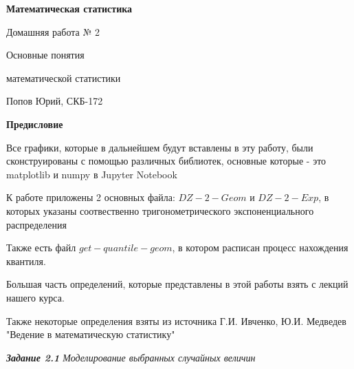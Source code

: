 \documentclass[a4paper,12pt, oneside]{book}
\begin{document}
	\pagestyle{plain}
	
	\begin{titlepage}	
		\begin{center}
			{\Huge \textbf{Математическая статистика}}
			\vspace{30mm}
			
			{\Huge Домашняя работа № 2 \\}
			\vspace{30mm}
			
			{\huge Основные понятия 
				
				математической статистики}
			\vspace{30mm}
			
			{\Large Попов Юрий, СКБ-172}
		\end{center}
	\end{titlepage}
	
	
	
	\begin{spacing}{0.99}          
		\tableofcontents %
	\end{spacing}

\newpage
\begin{center}
	{\Huge{\bf{Предисловие}}}
\end{center}

\vspace{5mm}
Все графики, которые в дальнейшем будут вставлены в эту работу, были сконструированы с помощью различных библиотек, основные которые - это matplotlib  и numpy в Jupyter Notebook

К работе приложены 2 основных файла: $DZ-2-Geom$ и $DZ-2-Exp$, в которых указаны соотвественно тригонометрического экспоненциального распределения

Также есть файл $get-quantile-geom$, в котором расписан процесс нахождения квантиля.
\vspace{5mm}

Большая часть определений, которые представлены в этой работы взять с лекций нашего курса. 
\vspace{5mm}

Также некоторые определения взяты из источника   Г.И. Ивченко, Ю.И. Медведев \\
"Ведение в математическую статистику"

 
\newpage
{\large\textit{\textbf{Задание 2.1} Моделирование выбранных случайных величин}}
\end{document}
